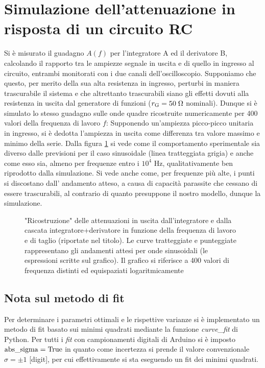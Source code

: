 \documentclass{article}[a4paper, oneside ,11pt]
\begin{document}
\section{Simulazione dell'attenuazione in risposta di un circuito RC}
Si è misurato il guadagno $A(f)$ per l’integratore A ed il derivatore B,
calcolando il rapporto tra le ampiezze segnale in uscita e di quello in
ingresso al circuito, entrambi monitorati con i due canali dell’oscilloscopio.
Supponiamo che questo, per merito della sua alta resistenza in ingresso,
perturbi in maniera trascurabile il sistema e che altrettanto trascurabili
siano gli effetti dovuti alla resistenza in uscita dal generatore di funzioni
($r_{\rm G} = 50 \; \Omega$ nominali). Dunque si è simulato lo stesso guadagno
sulle onde quadre ricostruite numericamente per 400 valori della frequenza di
lavoro $f$: Supponendo un'ampiezza picco-picco unitaria in ingresso, si è
dedotta l'ampiezza in uscita come differenza tra valore massimo e minimo della serie.
Dalla figura \ref{plt:gain} si vede come il comportamento sperimentale sia
diverso dalle previsioni per il caso sinusoidale (linea tratteggiata grigia)
e anche come esso sia, almeno per frequenze entro i $10^4$ Hz,
qualitativamente ben riprodotto dalla simulazione.
Si vede anche come, per frequenze più alte, i punti si discostano dall'
andamento atteso, a causa di capacità parassite che cessano di essere
trascurabili, al contrario di quanto presuppone il nostro modello,
dunque la simulazione.
\begin{figure}[!htb]
	\centering 
 		\scalebox{0.9}{}
 	\caption{"Ricostruzione" delle attenuazioni in uscita dall’integratore e dalla cascata integratore+derivatore in funzione della frequenza di lavoro e di taglio (riportate nel titolo). Le curve tratteggiate e punteggiate rappresentano gli andamenti attesi per onde sinusoidali (le espressioni scritte sul grafico). Il grafico si riferisce a 400 valori di frequenza distinti ed equispaziati logaritmicamente \label{plt:gain}}
\end{figure}
\subsection*{Nota sul metodo di fit}
Per determinare i parametri ottimali e le rispettive varianze si \`e implementato un metodo di fit basato sui minimi quadrati mediante la funzione \emph{curve\_fit} di Python.
Per tutti i \emph{fit} con campionamenti digitali di Arduino si è imposto $\rm{abs\_sigma} = \rm True$ in quanto come incertezza si prende il valore convenzionale $\sigma = \pm 1$ [digit], per cui effettivamente si sta eseguendo un fit dei minimi quadrati.\\
\medskip


\end{document}
